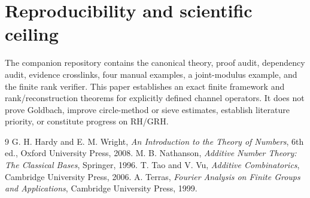 \documentclass[11pt]{article}
\theoremstyle{definition}
\begin{document}
\section{Reproducibility and scientific ceiling}
The companion repository contains the canonical theory, proof audit, dependency audit, evidence crosslinks, four manual examples, a joint-modulus example, and the finite rank verifier. This paper establishes an exact finite framework and rank/reconstruction theorems for explicitly defined channel operators. It does not prove Goldbach, improve circle-method or sieve estimates, establish literature priority, or constitute progress on RH/GRH.

\begin{thebibliography}{9}
 G. H. Hardy and E. M. Wright, \emph{An Introduction to the Theory of Numbers}, 6th ed., Oxford University Press, 2008.
 M. B. Nathanson, \emph{Additive Number Theory: The Classical Bases}, Springer, 1996.
 T. Tao and V. Vu, \emph{Additive Combinatorics}, Cambridge University Press, 2006.
 A. Terras, \emph{Fourier Analysis on Finite Groups and Applications}, Cambridge University Press, 1999.
\end{thebibliography}
\end{document}
